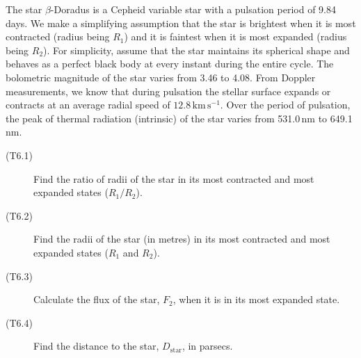 The star $\beta$-Doradus is a Cepheid variable star with a pulsation period
of 9.84 days. We make a simplifying assumption that the star is brightest
when it is most contracted (radius being $R_1$) and it is faintest when it is
most expanded (radius being $R_2$). For simplicity, assume that the star
maintains its spherical shape and behaves as a perfect black body at every
instant during the entire cycle. The bolometric magnitude of the star varies
from 3.46 to 4.08. From Doppler measurements, we know that during pulsation
the stellar surface expands or contracts at an average radial speed of
$12.8\,\mathrm{km\,s^{-1}}$. Over the period of pulsation, the peak of
thermal radiation (intrinsic) of the star varies from 531.0\,nm to
649.1\,nm.

\begin{description}
\item[(T6.1)] Find the ratio of radii of the star in its most contracted and
  most expanded states ($R_1/R_2$).
\item[(T6.2)] Find the radii of the star (in metres) in its most contracted
  and most expanded states ($R_1$ and $R_2$).
\item[(T6.3)] Calculate the flux of the star, $F_2$, when it is in its most
  expanded state.
\item[(T6.4)] Find the distance to the star, $D_{\mathrm{star}}$, in
  parsecs.
\end{description}
